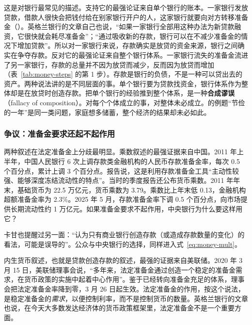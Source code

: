 \begin{pitfall}[银行把储户的存款贷出去]
这是对银行最常见的描述。支持它的最强论证来自单个银行的账本。一家银行发放贷款，借款人很快会把钱付给在别家银行开户的人，这家银行就要向对方转移准备金（）。英格兰银行的文章自己也说，“如果一家银行全部用这种办法为新贷款融资，它很快就会耗尽准备金”；“通过吸收新的存款，银行可以在不减少准备金的情况下增加贷款”\cite{mcleay2014}。所以对一家银行来说，存款确实是放贷的资金来源，银行之间确实在争夺存款。反对它的最强论证来自整个银行体系。一家银行流失的准备金流进了另一家银行，存款的总量并不因为放贷而减少，反而因为放贷而增加（表~\ref{tab:money-steps} 的第 1 步）。存款是银行的负债，不是一种可以贷出去的资产\cite{mcleay2014}。两种说法讲的是不同层面的事。单个银行要为贷款找资金，银行体系作为整体却是在放贷时创造存款。把单个银行的经验推到整个体系，是一种\textbf{合成谬误}（fallacy of composition）。对每个个体成立的事，对整体未必成立。的例题“节俭的一年”是同一类问题，家庭想多储蓄，整个经济的结果却未必如此。
\end{pitfall}

\subsubsection{争议：准备金要求还起不起作用}
两种叙述在法定准备金上分歧最明显。乘数叙述的最强证据来自中国。2011 年上半年，中国人民银行 6 次上调存款类金融机构的人民币存款准备金率，每次 0.5 个百分点，累计上调 3 个百分点。报告说，这是利用存款准备金工具“主动性较强、能够深度冻结流动性的特点”\cite{pbc2011q4}。当时的季度报告还公布货币乘数。2011 年年末，基础货币为 22.5 万亿元，货币乘数为 3.79。乘数比上年末低 0.13，金融机构超额准备金率为 2.3\%\cite{pbc2011q4}。2025 年 5 月，存款准备金率下调 0.5 个百分点，向市场提供长期流动性约 1 万亿元\cite{pbc2025q2}。如果准备金要求不起作用，中央银行为什么要这样用它？

卡甘也提醒过另一面：“认为只有商业银行创造存款（或造成存款数量的变化）的看法，可能是误导的”\cite{cagan1965}。公众与中央银行的选择，同样进入式~\eqref{eq:money-mult}。

内生货币叙述，也就是贷款创造存款的叙述，最强的证据来自美联储。2020 年 3 月 15 日，美联储理事会说，“多年来，法定准备金通过创造一个稳定的准备金需求，在货币政策的实施中起着中心作用”。鉴于已经转向准备金充足的体系，理事会把法定准备金率降到零，3 月 26 日起生效\cite{fed2020rr}。法定准备金的作用，按这个说法，是稳定准备金的\emph{需求}，以便控制利率，而不是控制货币的数量。英格兰银行的文章也说，在今天大多数发达经济体的货币政策框架里，法定准备金不是一个重要方面\cite{mcleay2014}。

